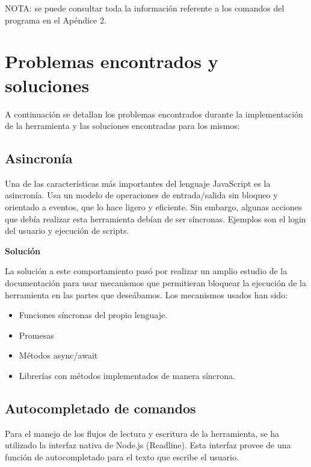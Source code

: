 NOTA: se puede consultar toda la información referente a los comandos del programa en el Apéndice 2.

\section{Problemas encontrados y soluciones}
\label{3:sec:3}

A continuación se detallan los problemas encontrados durante la implementación de la herramienta y las soluciones encontradas para los mismos:

\subsection{Asincronía}
\label{subsec:3.3.1}

Una de las características más importantes del lenguaje JavaScript es la asincronía. Usa un modelo de operaciones de entrada/salida sin bloqueo y orientado a eventos, que lo hace ligero y eficiente. Sin embargo, algunas acciones que debía realizar esta herramienta debían de ser síncronas. Ejemplos son el login del usuario y ejecución de scripts.
\bigskip

{\normalsize {\bfseries Solución}}
\bigskip

La solución a este comportamiento pasó por realizar un amplio estudio de la documentación para usar mecanismos que permitieran bloquear la ejecución de la herramienta en las partes que deseábamos. Los mecanismos usados han sido:

\begin{itemize}
	\item Funciones síncronas del propio lenguaje.
	\item Promesas
	\item Métodos async/await
	\item Librerías con métodos implementados de manera síncrona.
\end{itemize}

\subsection{Autocompletado de comandos}
\label{subsec:3.3.2}

Para el manejo de los flujos de lectura y escritura de la herramienta, se ha utilizado la interfaz nativa de Node.js (Readline). Esta interfaz provee de una función de autocompletado para el texto que escribe el usuario.

